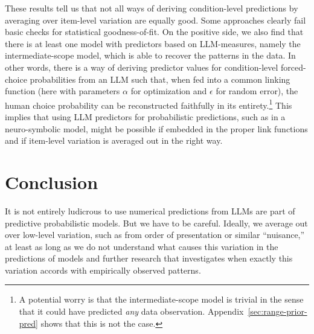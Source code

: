 \documentclass[fleqn]{article}
\begin{document}



These results tell us that not all ways of deriving condition-level predictions by averaging over item-level variation are equally good.
Some approaches clearly fail basic checks for statistical goodness-of-fit.
On the positive side, we also find that there is at least one model with predictors based on LLM-measures, namely the intermediate-scope model, which is able to recover the patterns in the data.
In other words, there is a way of deriving predictor values for condition-level forced-choice probabilities from an LLM such that, when fed into a common linking function (here with parameters $\alpha$ for optimization and $\epsilon$ for random error), the human choice probability can be reconstructed faithfully in its entirety.\footnote{
  A potential worry is that the intermediate-scope model is trivial in the sense that it could have predicted \emph{any} data observation.
  Appendix~\ref{sec:range-prior-pred} shows that this is not the case.
}
This implies that using LLM predictors for probabilistic predictions, such as in a neuro-symbolic model, might be possible if embedded in the proper link functions and if item-level variation is averaged out in the right way.


\section{Conclusion}
\label{conclusion}

It is not entirely ludicrous to use numerical predictions from LLMs are
part of predictive probabilistic models. But we have to be careful.
Ideally, we average out over low-level variation, such as from order of
presentation or similar ``nuisance,'' at least as long as we do not
understand what causes this variation in the predictions of models and
further research that investigates when exactly this variation accords
with empirically observed patterns.
\end{document}
